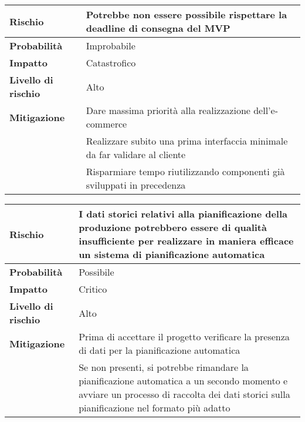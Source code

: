 \begin{table}[H]
  \begin{tabularx}{\textwidth}{lX}
    \toprule
    \textbf{Rischio}            & \textbf{Potrebbe non essere possibile rispettare la deadline di consegna del MVP} \\
    \midrule
    \textbf{Probabilità}        & Improbabile                                                                       \\
    \textbf{Impatto}            & Catastrofico                                                                      \\
    \textbf{Livello di rischio} & Alto                                                                              \\
    \textbf{Mitigazione}        & Dare massima priorità alla realizzazione dell'e-commerce                          \\
                                & Realizzare subito una prima interfaccia minimale da far validare al cliente       \\
                                & Risparmiare tempo riutilizzando componenti già sviluppati in precedenza           \\
    \bottomrule
  \end{tabularx}
\end{table}

\begin{table}[H]
  \begin{tabularx}{\textwidth}{lX}
    \toprule
    \textbf{Rischio}            & \textbf{I dati storici relativi alla pianificazione della produzione potrebbero essere di qualità insufficiente per realizzare in maniera efficace un sistema di pianificazione automatica} \\
    \midrule
    \textbf{Probabilità}        & Possibile                                                                                                                                                                                   \\
    \textbf{Impatto}            & Critico                                                                                                                                                                                     \\
    \textbf{Livello di rischio} & Alto                                                                                                                                                                                        \\
    \textbf{Mitigazione}        & Prima di accettare il progetto verificare la presenza di dati per la pianificazione automatica                                                                                              \\
                                & Se non presenti, si potrebbe rimandare la pianificazione automatica a un secondo momento e avviare un processo di raccolta dei dati storici sulla pianificazione nel formato più adatto     \\
    \bottomrule
  \end{tabularx}
\end{table}

